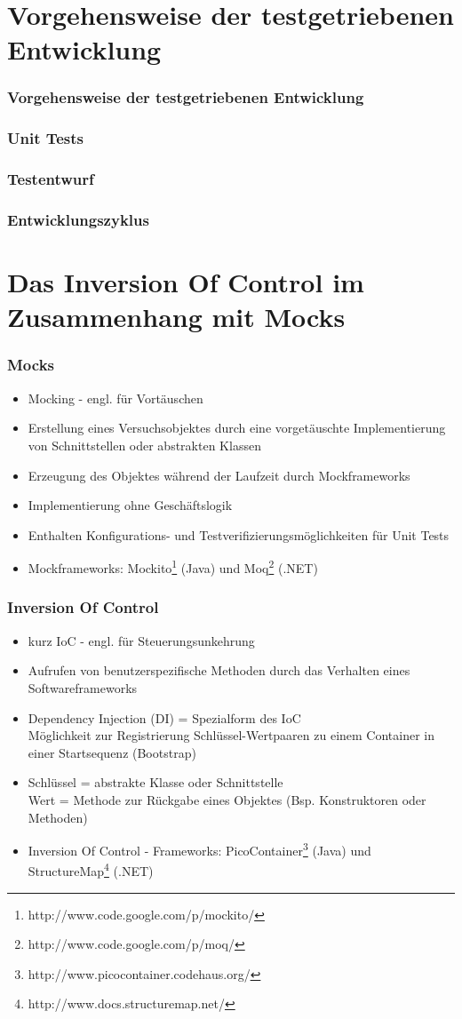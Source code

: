 \documentclass{beamer}
\begin{document}
\section{Vorgehensweise der testgetriebenen Entwicklung}
\begin{frame}
\frametitle{Vorgehensweise der testgetriebenen Entwicklung}
\end{frame}

\begin{frame}
\frametitle{Unit Tests}
\end{frame}

\begin{frame}
\frametitle{Testentwurf}
\end{frame}

\begin{frame}
\frametitle{Entwicklungszyklus}
\end{frame}

\section{Das Inversion Of Control im Zusammenhang mit Mocks}
\begin{frame}
\frametitle{Mocks}
\begin{itemize}
\item Mocking - engl. für Vortäuschen
\item Erstellung eines Versuchsobjektes durch eine vorgetäuschte Implementierung von Schnittstellen oder abstrakten Klassen
\item Erzeugung des Objektes während der Laufzeit durch Mockframeworks
\item Implementierung ohne Geschäftslogik
\item Enthalten Konfigurations- und Testverifizierungsmöglichkeiten für Unit Tests
\item Mockframeworks: Mockito\footnote{http://www.code.google.com/p/mockito/} (Java) und Moq\footnote{http://www.code.google.com/p/moq/} (.NET)
\end{itemize}
\end{frame}

\begin{frame}
\frametitle{Inversion Of Control}
\begin{itemize}
\item kurz IoC - engl. für Steuerungsunkehrung
\item Aufrufen von benutzerspezifische Methoden durch das Verhalten eines Softwareframeworks
\item Dependency Injection (DI) = Spezialform des IoC\\Möglichkeit zur Registrierung Schlüssel-Wertpaaren zu einem Container in einer Startsequenz (Bootstrap)
\item Schlüssel = abstrakte Klasse oder Schnittstelle\\Wert = Methode zur Rückgabe eines Objektes (Bsp. Konstruktoren oder Methoden)
\item Inversion Of Control - Frameworks:
PicoContainer\footnote{http://www.picocontainer.codehaus.org/} (Java) und StructureMap\footnote{http://www.docs.structuremap.net/} (.NET)
\end{itemize}
\end{frame}
\end{document}
